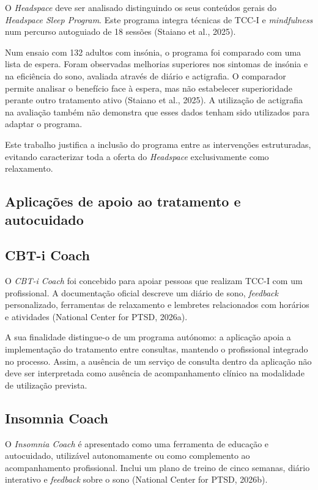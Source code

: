 O \textit{Headspace} deve ser analisado distinguindo os seus conteúdos gerais do \textit{Headspace Sleep Program}. Este programa integra técnicas de TCC-I e \textit{mindfulness} num percurso autoguiado de 18 sessões (Staiano et al., 2025).

Num ensaio com 132 adultos com insónia, o programa foi comparado com uma lista de espera. Foram observadas melhorias superiores nos sintomas de insónia e na eficiência do sono, avaliada através de diário e actigrafia. O comparador permite analisar o benefício face à espera, mas não estabelecer superioridade perante outro tratamento ativo (Staiano et al., 2025). A utilização de actigrafia na avaliação também não demonstra que esses dados tenham sido utilizados para adaptar o programa.

Este trabalho justifica a inclusão do programa entre as intervenções estruturadas, evitando caracterizar toda a oferta do \textit{Headspace} exclusivamente como relaxamento.

\subsection{Aplicações de apoio ao tratamento e autocuidado}

\subsection*{CBT-i Coach}

O \textit{CBT-i Coach} foi concebido para apoiar pessoas que realizam TCC-I com um profissional. A documentação oficial descreve um diário de sono, \textit{feedback} personalizado, ferramentas de relaxamento e lembretes relacionados com horários e atividades (National Center for PTSD, 2026a).

A sua finalidade distingue-o de um programa autónomo: a aplicação apoia a implementação do tratamento entre consultas, mantendo o profissional integrado no processo. Assim, a ausência de um serviço de consulta dentro da aplicação não deve ser interpretada como ausência de acompanhamento clínico na modalidade de utilização prevista.

\subsection*{Insomnia Coach}

O \textit{Insomnia Coach} é apresentado como uma ferramenta de educação e autocuidado, utilizável autonomamente ou como complemento ao acompanhamento profissional. Inclui um plano de treino de cinco semanas, diário interativo e \textit{feedback} sobre o sono (National Center for PTSD, 2026b).

